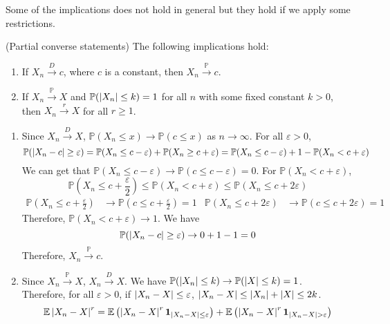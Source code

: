 \documentclass{huhtakm-template-book}
\newcommand{\prob}{\mathbb{P}}
\newcommand{\expect}{\mathbb{E}}
\begin{document}
Some of the implications does not hold in general but they hold if we apply some restrictions.
\begin{thm}(Partial converse statements)
	The following implications hold:
	\begin{enumerate}
		\item If $X_{n}\xrightarrow{D}c$, where $c$ is a constant, then $X_{n}\xrightarrow{\prob}c$.
		\item If $X_{n}\xrightarrow{\prob}X$ and $\prob(\abs{X_{n}}\leq k)=1$ for all $n$ with some fixed constant $k>0$, then $X_{n}\xrightarrow{r}X$ for all $r\geq 1$.
	\end{enumerate}
\end{thm}
\begin{proofing}
	\begin{enumerate}
		\item Since $X_{n}\xrightarrow{D}X$, $\prob(X_{n}\leq x)\to\prob(c\leq x)$ as $n\to\infty$. For all $\varepsilon>0$,
		\begin{equation*}
			\prob(\abs{X_{n}-c}\geq\varepsilon)=\prob(X_{n}\leq c-\varepsilon)+\prob(X_{n}\geq c+\varepsilon)=\prob(X_{n}\leq c-\varepsilon)+1-\prob(X_{n}<c+\varepsilon)
		\end{equation*}
		We can get that $\prob(X_{n}\leq c-\varepsilon)\to\prob(c\leq c-\varepsilon)=0$. For $\prob(X_{n}<c+\varepsilon)$,
		\begin{equation*}
			\prob\left(X_{n}\leq c+\frac{\varepsilon}{2}\right)\leq\prob(X_{n}<c+\varepsilon)\leq\prob(X_{n}\leq c+2\varepsilon)
		\end{equation*}
		\begin{align*}
			\prob\left(X_{n}\leq c+\frac{\varepsilon}{2}\right)&\to\prob\left(c\leq c+\frac{\varepsilon}{2}\right)=1 & \prob(X_{n}\leq c+2\varepsilon)&\to\prob(c\leq c+2\varepsilon)=1
		\end{align*}
		Therefore, $\prob(X_{n}<c+\varepsilon)\to 1$. We have
		\begin{equation*}
			\prob(\abs{X_{n}-c}\geq\varepsilon)\to 0+1-1 = 0
		\end{equation*}
		Therefore, $X_{n}\xrightarrow{\prob}c$.
		\item Since $X_{n}\xrightarrow{\prob}X$, $X_{n}\xrightarrow{D}X$. We have $\prob(\abs{X_{n}}\leq k)\to\prob(\abs{X}\leq k)=1$.\\
		Therefore, for all $\varepsilon>0$, if $\left|{X_{n}-X}\right|\leq\varepsilon$, $\left|{X_{n}-X}\right|\leq\left|{X_{n}}\right|+\left|{X}\right|\leq 2k$.
		\begin{align*}
			\expect\abs{X_{n}-X}^{r}&=\expect\left(\abs{X_{n}-X}^{r}\mathbf{1}_{\abs{X_{n}-X}\leq\varepsilon}\right)+\expect\left(\abs{X_{n}-X}^{r}\mathbf{1}_{\abs{X_{n}-X}>\varepsilon}\right)\\

\end{align*}
\end{enumerate}
\end{proofing}
\end{document}
